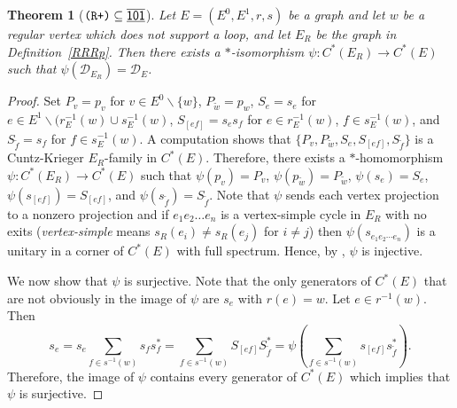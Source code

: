 \documentclass[12pt]{amsbook}%
\newtheorem{theor}{Theorem}[section]
\theoremstyle{defin}
\theoremstyle{remark}
\numberwithin{equation}{chapter}
\numberwithin{theor}{section}
\newcommand{\xyzrel}[1]{\mbox{$\overline{\underline{\mathsf{ #1}}}$}}
\newcommand{\RRRp}{\mbox{\texttt{\textup{(R+)}}}}
\begin{document}
\begin{theor}[$\RRRp\subseteq \xyzrel{101}$]\label{thm:reduction-plus}
Let $E=(E^0,E^1,r,s)$ be a graph and let $w$ be a regular vertex  which does not support a loop, and let $E_{R}$ be the graph in Definition~\ref{RRRp}.  Then there exists a $*$-isomorphism $\psi \colon C^*(E_{R}) \to C^*(E)$ such that $\psi ( \mathcal{D}_{{E_R}}) = \mathcal{D}_E$.
\end{theor}

\begin{proof}
Set $P_v = p_v$ for 	$v\in E^0\backslash\{w\}$, $P_{\widetilde{w}} = p_w$, $S_e = s_e$ for $e\in E^1\backslash(r^{-1}_E(w)\cup s^{-1}_E(w)$, $S_{[ef]} = s_e s_f$ for $e\in r^{-1}_E(w)$, $f\in s^{-1}_E(w)$, and $S_{ \widetilde{f} } = s_f$ for $f\in s^{-1}_E(w)$.  A computation shows that $\{ P_v , P_{\widetilde{w}}, S_e, S_{[ef]}, S_{\widetilde{f}} \}$ is a Cuntz-Krieger $E_{R}$-family in $C^*(E)$.  Therefore, there exists a $*$-homomorphism $\psi \colon C^*(E_{R}) \to C^*(E)$ such that $\psi ( p_v ) = P_v$, $\psi ( p_{\widetilde{w}} ) = P_{\widetilde{w}}$, $\psi ( s_e ) = S_e$, $\psi ( s_{ [ef] } ) = S_{[ef]}$, and $\psi ( s_{\widetilde{f}} ) = S_{ \widetilde{f}}$.  Note that $\psi$ sends each vertex projection to a nonzero projection and if $e_1 e_2 \ldots e_n$ is a vertex-simple cycle in $E_{R}$ with no exits (\emph{vertex-simple} means $s_{{R}} ( e_i) \neq s_{{R}} ( e_j )$ for $i \neq j$) then $\psi ( s_{e_1 e_2\cdots e_n})$ is a unitary in a corner of $C^*(E)$ with full spectrum.  Hence, by \cite[Theorem~1.2]{ws:gckut}, $\psi$ is injective.

We now show that $\psi$ is surjective.  Note that the only generators of $C^*(E)$ that are not obviously in the image of $\psi$ are $s_e$ with $r(e) = w$.  Let $e \in r^{-1}(w)$.  Then 
\[
s_e = s_e \sum_{ f \in s^{-1} (w) } s_f s_f^* = \sum_{ f \in s^{-1} (w) } S_{[ef]} S_{\widetilde{f}}^* = \psi \left( \sum_{ f \in s^{-1} (w) } s_{[ef]} s_{\widetilde{f}}^* \right).
\]
Therefore, the image of $\psi$ contains every generator of $C^*(E)$ which implies that $\psi$ is surjective.


\end{proof}
\end{document}
